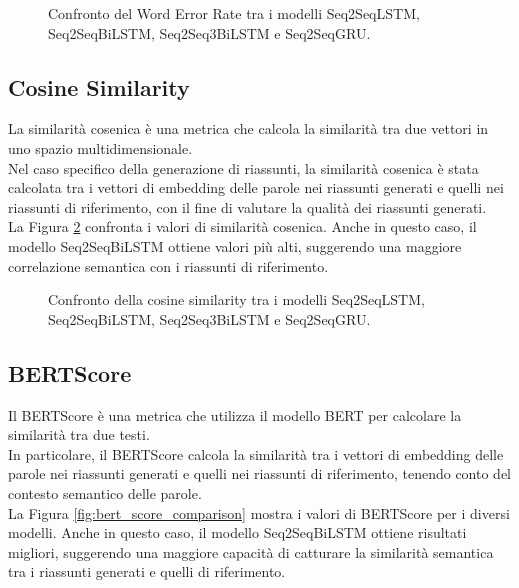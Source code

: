 \begin{figure}[H]
    \centering
    \hfill
    \hfill
    \hfill

    \caption{Confronto del Word Error Rate tra i modelli Seq2SeqLSTM, Seq2SeqBiLSTM, Seq2Seq3BiLSTM e Seq2SeqGRU.}
    \label{fig:wer_comparison}
\end{figure}


\subsection{Cosine Similarity}
La similarit\`a cosenica \`e una metrica che calcola la similarit\`a tra due vettori in uno spazio multidimensionale.\\
Nel caso specifico della generazione di riassunti, la similarit\`a cosenica \`e stata calcolata tra i vettori di embedding delle parole nei riassunti generati e quelli nei riassunti di riferimento, con il fine di valutare la qualit\`a dei riassunti generati.\\
La Figura \ref{fig:cosine_similarity_comparison} confronta i valori di similarit\`a cosenica. Anche in questo caso, il modello Seq2SeqBiLSTM ottiene valori pi\`u alti, suggerendo una maggiore correlazione semantica con i riassunti di riferimento.

\begin{figure}[H]
    \centering
    \hfill
    \hfill
    \hfill

    \caption{Confronto della cosine similarity tra i modelli Seq2SeqLSTM, Seq2SeqBiLSTM, Seq2Seq3BiLSTM e Seq2SeqGRU.}
    \label{fig:cosine_similarity_comparison}
\end{figure}

\subsection{BERTScore}
Il BERTScore \`e una metrica che utilizza il modello BERT per calcolare la similarit\`a tra due testi.\\
In particolare, il BERTScore calcola la similarit\`a tra i vettori di embedding delle parole nei riassunti generati e quelli nei riassunti di riferimento, tenendo conto del contesto semantico delle parole.\\
La Figura \ref{fig:bert_score_comparison} mostra i valori di BERTScore per i diversi modelli. Anche in questo caso, il modello Seq2SeqBiLSTM ottiene risultati migliori, suggerendo una maggiore capacit\`a di catturare la similarit\`a semantica tra i riassunti generati e quelli di riferimento.

